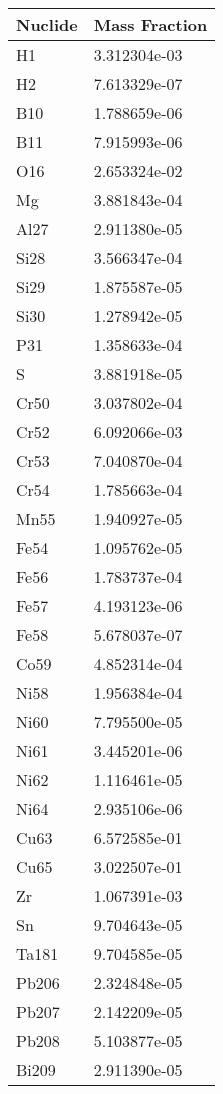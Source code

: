 \begin{centering}
\begin{longtable}[ht!]
\caption{Table showing the isotopic description of material EppValves}
\label{table:material_EppValves}
\end{longtable}\clearpage

\begin{longtable}[ht!]
{ p{} | p{} }
\hline
Nuclide & Mass Fraction\\
\hline
H1 & 3.312304e-03\\
H2 & 7.613329e-07\\
B10 & 1.788659e-06\\
B11 & 7.915993e-06\\
O16 & 2.653324e-02\\
Mg & 3.881843e-04\\
Al27 & 2.911380e-05\\
Si28 & 3.566347e-04\\
Si29 & 1.875587e-05\\
Si30 & 1.278942e-05\\
P31 & 1.358633e-04\\
S & 3.881918e-05\\
Cr50 & 3.037802e-04\\
Cr52 & 6.092066e-03\\
Cr53 & 7.040870e-04\\
Cr54 & 1.785663e-04\\
Mn55 & 1.940927e-05\\
Fe54 & 1.095762e-05\\
Fe56 & 1.783737e-04\\
Fe57 & 4.193123e-06\\
Fe58 & 5.678037e-07\\
Co59 & 4.852314e-04\\
Ni58 & 1.956384e-04\\
Ni60 & 7.795500e-05\\
Ni61 & 3.445201e-06\\
Ni62 & 1.116461e-05\\
Ni64 & 2.935106e-06\\
Cu63 & 6.572585e-01\\
Cu65 & 3.022507e-01\\
Zr & 1.067391e-03\\
Sn & 9.704643e-05\\
Ta181 & 9.704585e-05\\
Pb206 & 2.324848e-05\\
Pb207 & 2.142209e-05\\
Pb208 & 5.103877e-05\\
Bi209 & 2.911390e-05\\


\end{longtable}
\end{centering}
